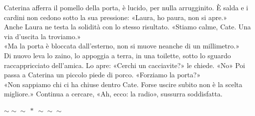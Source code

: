\documentclass[10pt,oneside]{extbook}
\newcommand{\separatore}{\par
  \begin{center}
    {\Large $\sim\!\!\sim\!\!\sim\ \ast\ \sim\!\!\sim\!\!\sim$}
  \end{center}
  \par
}
\begin{document}
\par\medskip
Caterina afferra il pomello della porta, \`e lucido, per nulla arrugginito. \`E salda e i cardini non cedono  sotto la sua pressione:
«Laura, ho paura, non si apre.»\\
Anche Laura ne testa la solidità con lo stesso risultato. «Stiamo calme, Cate. Una via d’uscita la troviamo.»\\
«Ma la porta \`e bloccata dall’esterno, non si muove neanche di un millimetro.»\\
Di nuovo leva lo zaino, lo appoggia a terra, in una toilette, sotto lo sguardo raccappricciato dell'amica. Lo apre:
«Cerchi un cacciavite?» le chiede. «No» Poi passa a Caterina un piccolo piede di porco. «Forziamo la porta?»\\
«Non sappiamo chi ci ha chiuse dentro Cate. Forse uscire subito non \`e la scelta migliore.» Continua a cercare, «Ah, ecco: la radio», sussurra soddisfatta.

\separatore
\end{document}
